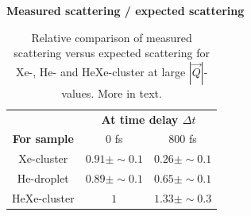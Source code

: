 \begin{table}%
\centering
\textbf{Measured scattering / expected scattering}\\
\begin{tabular}{ | c || c | c | }
\hline
	 &\multicolumn{2}{c|}{\textbf{At time delay $\Delta t$}} \\
	\textbf{For sample} & 0 fs  & 800 fs \\ \hline \hline
	Xe-cluster & $0.91\pm \sim 0.1$ & $0.26\pm \sim 0.1$ \\ \hline
	He-droplet & $0.89\pm \sim 0.1$ & $0.65\pm \sim 0.1$ \\ \hline
	HeXe-cluster & $1$ & $1.33\pm \sim 0.3$ \\ \hline
\end{tabular}
\caption[Relative comparison of measured scattering versus expected scattering.]{Relative comparison of measured scattering versus expected scattering for Xe-, He- and HeXe-cluster at large $\left|\vec{Q}\right|$-values. More in text.}
\label{tab:he-vs-xe-vs-hexe-summary}
\end{table}
